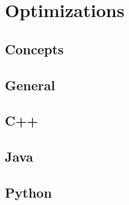 \section{Optimizations}

\subsection{Concepts}

\subsection{General}

\subsection{C++}

\subsection{Java}

\subsection{Python}

